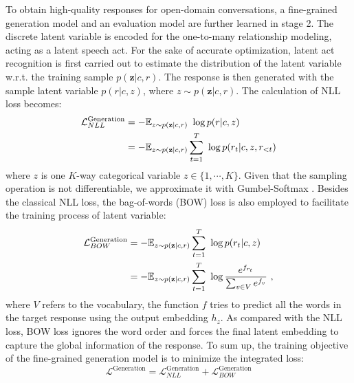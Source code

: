 \documentclass[letterpaper]{article} \usepackage{aaai21}  \usepackage{times}  \usepackage{helvet} \usepackage{courier}  \usepackage[hyphens]{url}  \usepackage{graphicx} \urlstyle{rm} \def\UrlFont{\rm}  \usepackage{natbib}  \usepackage{caption} \frenchspacing  \setlength{\pdfpagewidth}{8.5in}  \setlength{\pdfpageheight}{11in}  \usepackage{amsmath}
\begin{document}
To obtain high-quality responses for open-domain conversations, a fine-grained generation model and an evaluation model are further learned in stage 2. The discrete latent variable is encoded for the one-to-many relationship modeling, acting as a latent speech act. For the sake of accurate optimization, latent act recognition is first carried out to estimate the distribution of the latent variable w.r.t. the training sample $p(\mathbf{z}|c,r)$. The response is then generated with the sample latent variable $p(r|c,z)$, where $z\sim p(\mathbf{z}|c,r)$. The calculation of NLL loss becomes:
\begin{equation}
\begin{split}
\mathcal{L}_{NLL}^{\text{Generation}}&=-\mathbb{E}_{z\sim p(\mathbf{z}|c,r)} ~\log p(r|c,z)\\
&=-\mathbb{E}_{z\sim p(\mathbf{z}|c,r)} \sum_{t=1}^T~\log p(r_t|c,z,r_{<t})
\end{split}
\raisetag{2.6\baselineskip}
\end{equation}
where $z$ is one $K$-way categorical variable $z\in \{1,\cdots,K\}$. Given that the sampling operation is not differentiable, we approximate it with Gumbel-Softmax \cite{jang2016categorical}. Besides the classical NLL loss, the bag-of-words (BOW) loss \cite{zhao2017learning} is also employed to facilitate the training process of latent variable:
\begin{equation}
\begin{split}
\mathcal{L}_{BOW}^{\text{Generation}}&=-\mathbb{E}_{z\sim p(\mathbf{z}|c,r)}  \sum_{t=1}^T ~ \log p(r_t|c,z)\\
&=-\mathbb{E}_{z\sim p(\mathbf{z}|c,r)} \sum_{t=1}^T ~ \log \frac{e^{f_{r_t}}}{\sum_{v\in V} e^{f_v}}~,
\end{split}
\raisetag{2.6\baselineskip}
\end{equation}
where $V$ refers to the vocabulary, the function $f$ tries to predict all the words in the target response using the output embedding $h_z$. As compared with the NLL loss, BOW loss ignores the word order and forces the final latent embedding to capture the global information of the response. To sum up, the training objective of the fine-grained generation model is to minimize the integrated loss:
\begin{equation}
\mathcal{L}^{\text{Generation}}=\mathcal{L}_{NLL}^{\text{Generation}}+\mathcal{L}_{BOW}^{\text{Generation}}
\end{equation}
\end{document}
